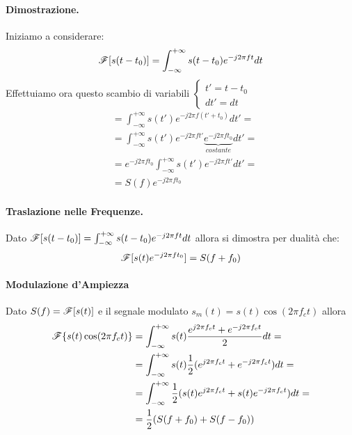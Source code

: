 \paragraph{Dimostrazione.}
Iniziamo a considerare:
\begin{equation*}
    {\mathscr{F}}[s(t - t_0)] = \int_{-\infty}^{+\infty} s(t - t_0) e^{-j2\pi ft} dt
\end{equation*}
Effettuiamo ora questo scambio di variabili $\begin{cases}
    t' = t - t_0\\
    dt' = dt
\end{cases}$
\begin{align*}
    &= \int_{-\infty}^{+\infty} s(t') e^{-j2\pi f(t' + t_0)} dt' =\\
    &= \int_{-\infty}^{+\infty} s(t') e^{-j2\pi ft'}\underbrace{e^{-j2\pi ft_0}}_{costante} dt' =\\
    &= e^{-j2\pi ft_0}\int_{-\infty}^{+\infty} s(t') e^{-j2\pi ft'} dt' =\\
    &= S(f)e^{-j2 \pi ft_0}
\end{align*}

\paragraph{Traslazione nelle Frequenze.}
Dato ${\mathscr{F}}[s(t - t_0)] = \int_{-\infty}^{+\infty} s(t - t_0) e^{-j2\pi ft} dt$ allora si dimostra per dualità che:
\begin{equation}
    {\mathscr{F}}[s(t)e^{-j2\pi ft_0}] = S(f + f_0)
\end{equation}

\paragraph{Modulazione d'Ampiezza}
Dato $S(f) = {\mathscr{F}}[s(t)]$ e il segnale modulato $s_m(t) = s(t) \cos(2\pi f_c t)$ allora
\begin{align*}
    {\mathscr{F}}\{s(t) \cos(2\pi f_ct)\} &=  \int_{-\infty}^{+\infty}s(t) \frac{e^{j2\pi f_ct}+e^{-j2\pi f_ct}}{2} dt=\\
                        &=  \int_{-\infty}^{+\infty}s(t) \frac{1}{2} (e^{j2\pi f_ct}+e^{-j2\pi f_ct}) dt=\\
                        &=  \int_{-\infty}^{+\infty}\frac{1}{2} (s(t)e^{j2\pi f_ct}+s(t)e^{-j2\pi f_ct}) dt=\\
                        &=  \frac{1}{2} (S(f + f_0) + S(f - f_0))
\end{align*}

